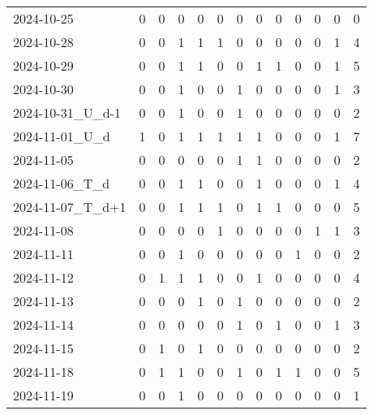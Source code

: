 \documentclass[dvipdfmx,oneside]{article}
\begin{document}
\begin{longtable}{lcccccccccccc}
        2024-10-25 &     0 &     0 &     0 &     0 &     0 &     0 &     0 &     0 &     0 &     0 &     0 &      0 \\
        2024-10-28 &     0 &     0 &     1 &     1 &     1 &     0 &     0 &     0 &     0 &     0 &     1 &      4 \\
        2024-10-29 &     0 &     0 &     1 &     1 &     0 &     0 &     1 &     1 &     0 &     0 &     1 &      5 \\
        2024-10-30 &     0 &     0 &     1 &     0 &     0 &     1 &     0 &     0 &     0 &     0 &     1 &      3 \\
2024-10-31\_U\_d-1 &     0 &     0 &     1 &     0 &     0 &     1 &     0 &     0 &     0 &     0 &     0 &      2 \\
  2024-11-01\_U\_d &     1 &     0 &     1 &     1 &     1 &     1 &     1 &     0 &     0 &     0 &     1 &      7 \\
        2024-11-05 &     0 &     0 &     0 &     0 &     0 &     1 &     1 &     0 &     0 &     0 &     0 &      2 \\
  2024-11-06\_T\_d &     0 &     0 &     1 &     1 &     0 &     0 &     1 &     0 &     0 &     0 &     1 &      4 \\
2024-11-07\_T\_d+1 &     0 &     0 &     1 &     1 &     1 &     0 &     1 &     1 &     0 &     0 &     0 &      5 \\
        2024-11-08 &     0 &     0 &     0 &     0 &     1 &     0 &     0 &     0 &     0 &     1 &     1 &      3 \\
        2024-11-11 &     0 &     0 &     1 &     0 &     0 &     0 &     0 &     0 &     1 &     0 &     0 &      2 \\
        2024-11-12 &     0 &     1 &     1 &     1 &     0 &     0 &     1 &     0 &     0 &     0 &     0 &      4 \\
        2024-11-13 &     0 &     0 &     0 &     1 &     0 &     1 &     0 &     0 &     0 &     0 &     0 &      2 \\
        2024-11-14 &     0 &     0 &     0 &     0 &     0 &     1 &     0 &     1 &     0 &     0 &     1 &      3 \\
        2024-11-15 &     0 &     1 &     0 &     1 &     0 &     0 &     0 &     0 &     0 &     0 &     0 &      2 \\
        2024-11-18 &     0 &     1 &     1 &     0 &     0 &     1 &     0 &     1 &     1 &     0 &     0 &      5 \\
        2024-11-19 &     0 &     0 &     1 &     0 &     0 &     0 &     0 &     0 &     0 &     0 &     0 &      1 \\

\end{longtable}
\end{document}
